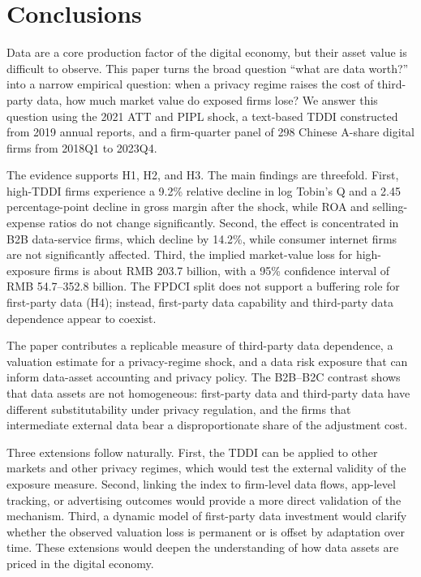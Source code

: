 \section{Conclusions}
\label{sec:conclusion}

Data are a core production factor of the digital economy, but their asset value is difficult to observe. This paper turns the broad question ``what are data worth?'' into a narrow empirical question: when a privacy regime raises the cost of third-party data, how much market value do exposed firms lose? We answer this question using the 2021 ATT and PIPL shock, a text-based TDDI constructed from 2019 annual reports, and a firm-quarter panel of 298 Chinese A-share digital firms from 2018Q1 to 2023Q4.

The evidence supports H1, H2, and H3. The main findings are threefold. First, high-TDDI firms experience a 9.2\% relative decline in log Tobin's Q and a 2.45 percentage-point decline in gross margin after the shock, while ROA and selling-expense ratios do not change significantly. Second, the effect is concentrated in B2B data-service firms, which decline by 14.2\%, while consumer internet firms are not significantly affected. Third, the implied market-value loss for high-exposure firms is about RMB 203.7 billion, with a 95\% confidence interval of RMB 54.7--352.8 billion. The FPDCI split does not support a buffering role for first-party data (H4); instead, first-party data capability and third-party data dependence appear to coexist.

The paper contributes a replicable measure of third-party data dependence, a valuation estimate for a privacy-regime shock, and a data risk exposure that can inform data-asset accounting and privacy policy. The B2B--B2C contrast shows that data assets are not homogeneous: first-party data and third-party data have different substitutability under privacy regulation, and the firms that intermediate external data bear a disproportionate share of the adjustment cost.

Three extensions follow naturally. First, the TDDI can be applied to other markets and other privacy regimes, which would test the external validity of the exposure measure. Second, linking the index to firm-level data flows, app-level tracking, or advertising outcomes would provide a more direct validation of the mechanism. Third, a dynamic model of first-party data investment would clarify whether the observed valuation loss is permanent or is offset by adaptation over time. These extensions would deepen the understanding of how data assets are priced in the digital economy.
